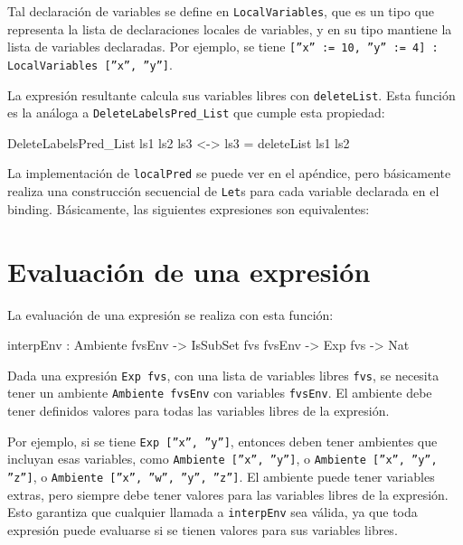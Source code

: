 Tal declaración de variables se define en \texttt{LocalVariables}, que es un tipo que representa la lista de declaraciones locales de variables, y en su tipo mantiene la lista de variables declaradas. Por ejemplo, se tiene \texttt{[''x'' := 10, ''y'' := 4] : LocalVariables [''x'', ''y'']}.

La expresión resultante calcula sus variables libres con \texttt{deleteList}. Esta función es la análoga a \texttt{DeleteLabelsPred\_List} que cumple esta propiedad:

\begin{code}
DeleteLabelsPred_List ls1 ls2 ls3 <-> ls3 = deleteList ls1 ls2
\end{code}

La implementación de \texttt{localPred} se puede ver en el apéndice, pero básicamente realiza una construcción secuencial de \texttt{Let}s para cada variable declarada en el binding. Básicamente, las siguientes expresiones son equivalentes:


\section{Evaluación de una expresión}

La evaluación de una expresión se realiza con esta función:

\begin{code}
interpEnv : Ambiente fvsEnv -> IsSubSet fvs fvsEnv ->
  Exp fvs -> Nat
\end{code}

Dada una expresión \texttt{Exp fvs}, con una lista de variables libres \texttt{fvs}, se necesita tener un ambiente \texttt{Ambiente fvsEnv} con variables \texttt{fvsEnv}. El ambiente debe tener definidos valores para todas las variables libres de la expresión.

Por ejemplo, si se tiene \texttt{Exp [''x'', ''y'']}, entonces deben tener ambientes que incluyan esas variables, como \texttt{Ambiente [''x'', ''y'']}, o \texttt{Ambiente [''x'', ''y'', ''z'']}, o \texttt{Ambiente [''x'', ''w'', ''y'', ''z'']}. El ambiente puede tener variables extras, pero siempre debe tener valores para las variables libres de la expresión. Esto garantiza que cualquier llamada a \texttt{interpEnv} sea válida, ya que toda expresión puede evaluarse si se tienen valores para sus variables libres.

